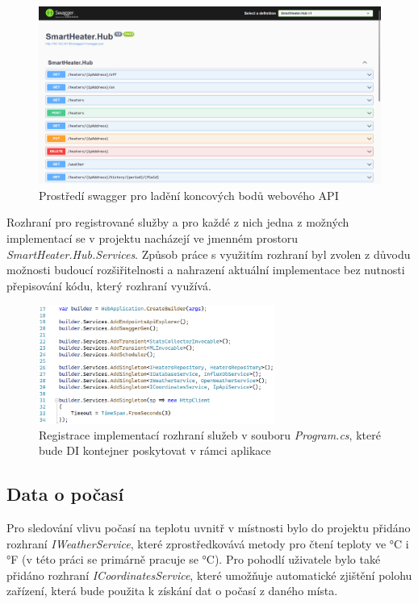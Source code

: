 \begin{figure}[hbt]
\includegraphics[width=\textwidth]{obrazky-figures/swagger.png}
\caption{Prostředí swagger pro ladění koncových bodů webového API}
\end{figure}

Rozhraní pro registrované služby a pro každé z nich jedna z možných implementací se v projektu nacházejí ve jmenném prostoru {\it SmartHeater.Hub.Services}. Způsob práce s využitím rozhraní byl zvolen z důvodu možnosti budoucí rozšiřitelnosti a nahrazení aktuální implementace bez nutnosti přepisování kódu, který rozhraní využívá.

\begin{figure}[hbt]
\centering
\includegraphics[width=0.69\textwidth]{obrazky-figures/code-hubservices.png}
\caption{Registrace implementací rozhraní služeb v souboru {\it Program.cs}, které bude DI kontejner poskytovat v rámci aplikace}
\end{figure}

\subsection{Data o počasí}
Pro sledování vlivu počasí na teplotu uvnitř v místnosti bylo do projektu přidáno rozhraní {\it IWeatherService}, které zprostředkovává metody pro čtení teploty ve °C i °F (v této práci se primárně pracuje se °C). Pro pohodlí uživatele bylo také přidáno rozhraní {\it ICoordinatesService}, které umožňuje automatické zjištění polohu zařízení, která bude použita k získání dat o počasí z daného místa.

